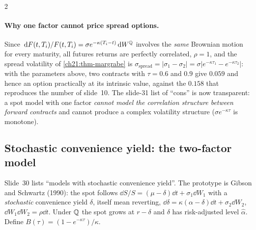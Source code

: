 \begin{paracol}{2}
\paragraph{Why one factor cannot price spread options.} Since $\,\mathrm{d} F(t,T_i)/F(t,T_i)=\sigma e^{-\kappa(T_i-t)}\,\mathrm{d} W^{\mathbb{Q}}$ involves the \emph{same} Brownian motion for every maturity, all futures returns are perfectly correlated, $\rho=1$, and the spread volatility of \cref{ch21:thm-margrabe} is
$\sigma_{\mathrm{spread}}=|\sigma_1-\sigma_2|=\sigma\lvert e^{-\kappa\tau_1}-e^{-\kappa\tau_2}\rvert$: with the parameters above, two contracts with $\tau=0.6$ and $0.9$ give $0.059$ and hence an option practically at its intrinsic value, against the $0.158$ that reproduces the number of slide~10. The slide-31 list of ``cons'' is now transparent: a spot model
with one factor \emph{cannot model the correlation structure between forward contracts} and cannot produce a complex volatility structure ($\sigma e^{-\kappa\tau}$ is monotone).

\subsection{Stochastic convenience yield: the two-factor model}\label{ch21:sec-gs}
Slide~30 lists ``models with stochastic convenience yield''. The prototype is Gibson and Schwartz (1990): the spot follows $\dd S/S=(\mu-\delta)\dd t+\sigma_1\dd W_1$ with a \emph{stochastic} convenience yield $\delta$, itself mean reverting, $\dd\delta=\kappa(\alpha-\delta)\dd t+\sigma_2\dd W_2$, $\dd W_1\dd W_2=\rho\dd t$.
Under $\mathbb{Q}$ the spot grows at $r-\delta$ and $\delta$ has risk-adjusted level $\hat\alpha$. Define $B(\tau)=(1-e^{-\kappa\tau})/\kappa$.


\end{paracol}
